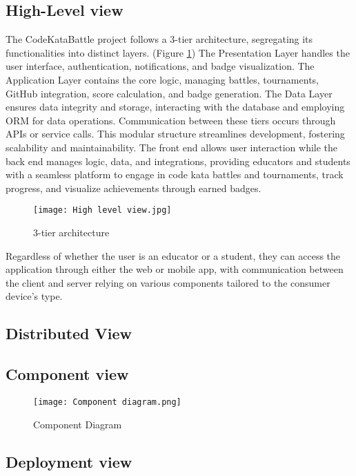 \documentclass{article}
\begin{document}
\subsection{High-Level view}

The CodeKataBattle project follows a 3-tier architecture, segregating its functionalities into distinct layers. (Figure \ref{fig:3-tier}) The Presentation Layer handles the user interface, authentication, notifications, and badge visualization. The Application Layer contains the core logic, managing battles, tournaments, GitHub integration, score calculation, and badge generation. The Data Layer ensures data integrity and storage, interacting with the database and employing ORM for data operations. Communication between these tiers occurs through APIs or service calls. This modular structure streamlines development, fostering scalability and maintainability. The front end allows user interaction while the back end manages logic, data, and integrations, providing educators and students with a seamless platform to engage in code kata battles and tournaments, track progress, and visualize achievements through earned badges.

\begin{figure}[H]
    \centering
    \texttt{[image: High level view.jpg]}
    \caption{3-tier architecture}
    \label{fig:3-tier}
\end{figure}

Regardless of whether the user is an educator or a student, they can access the application through either the web or mobile app, with communication between the client and server relying on various components tailored to the consumer device's type.

\subsection{Distributed View}
\subsection{Component view}

\begin{figure}[H]
    \centering
    \texttt{[image: Component diagram.png]}
    \caption{Component Diagram}
\end{figure}

\subsection{Deployment view}
\end{document}
